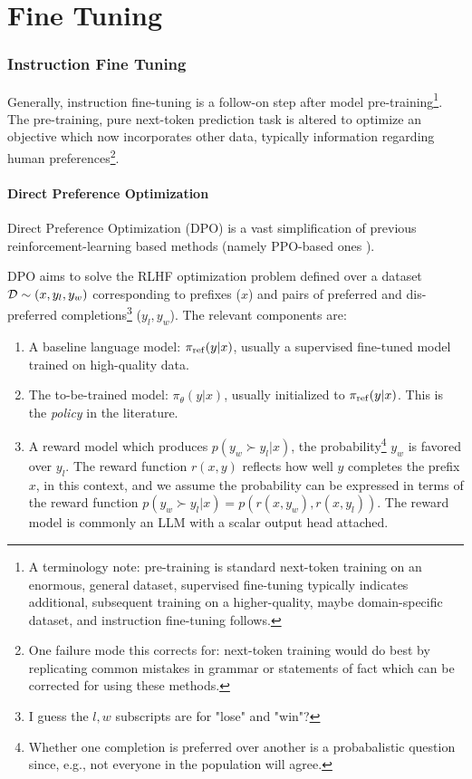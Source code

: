\part{Fine Tuning}

\section{Instruction Fine Tuning}

Generally, instruction fine-tuning is a follow-on step after model pre-training\footnote{A
terminology note: pre-training is standard next-token training on an enormous, general dataset, supervised
fine-tuning typically indicates additional, subsequent training on a higher-quality, maybe
domain-specific dataset, and instruction fine-tuning follows.}.
The pre-training, pure next-token prediction task is altered to optimize an objective which now
incorporates other data, typically information regarding human preferences\footnote{One failure mode
this corrects for: next-token training would do best by replicating common mistakes in grammar or
statements of fact which can be corrected for using these methods.}.


\subsection{Direct Preference Optimization}

Direct Preference Optimization (DPO) \cite{rafailov2024directpreferenceoptimizationlanguage} is a
vast simplification of previous reinforcement-learning based methods (namely PPO-based ones
\cite{schulman2017proximalpolicyoptimizationalgorithms}).


DPO aims to solve the RLHF optimization problem defined over a dataset $\mathcal{D} \sim  (x, y _{ l }, y
_{ w }) $ corresponding to prefixes ($ x $) and pairs of preferred and dis-preferred
completions\footnote{I guess the $ l, w $ subscripts are for "lose" and "win"?} ($ y _{ l }, y _{ w
} $). The relevant components are:
\begin{enumerate}
    \item A baseline language model: $ \pi _{ {\rm  ref} } (y|x)$, usually a supervised fine-tuned
        model trained on high-quality data.
    \item The to-be-trained model: $ \pi _{\theta } (y|x)$, usually initialized to $ \pi _{ {\rm
        ref} } (y|x)$. This is the \textit{policy} in the literature.
    \item A reward model which produces $ p(y _{ w } \succ y _{ l }| x ) $, the
        probability\footnote{Whether one completion is preferred over another is a probabalistic
        question since, e.g., not everyone in the population will agree.} $ y _{ w } $ is favored
        over $ y _{ l } $.  The reward function $ r(x, y) $ reflects how well $ y $ completes the
        prefix $ x $, in this context, and we assume the probability can be expressed in terms of
        the reward function $ p(y _{ w } \succ y _{ l }| x ) = p( r(x, y _{ w }), r(x, y _{ l }) )
        $. The reward model is commonly an LLM with a scalar output head attached.
\end{enumerate}


